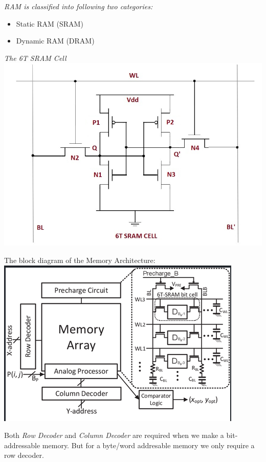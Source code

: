 \documentclass[12pt, letterpaper]{article}
\begin{document}
\emph{RAM is classified into following two categories:}
\begin{itemize}
    \item Static RAM (SRAM)
    \item Dynamic RAM (DRAM)
\end{itemize}

\emph{The 6T SRAM Cell} \\
\includegraphics [scale=0.5]{./images/sram-cell}

The block diagram of the Memory Architecture: \\
\includegraphics[scale=0.7]{./images/det_mem_arch}

Both \emph{Row Decoder} and \emph{Column Decoder} are required when we make a bit-addressable memory.
But for a byte/word addresable memory we only require a row decoder.
\end{document}
